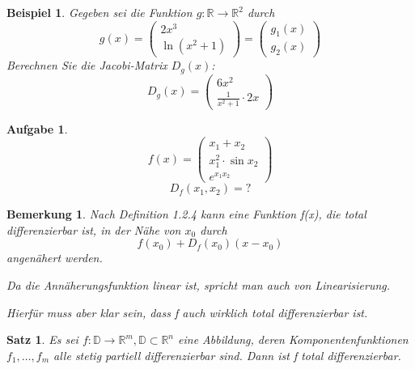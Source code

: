 \documentclass[12pt,a4paper]{scrreprt}
\newtheorem{bemerkung}[defi]{Bemerkung}
\newtheorem{beispiel}[defi]{Beispiel}
\newtheorem{satz}[defi]{Satz}
\newtheorem{aufg}[defi]{Aufgabe}
\begin{document}
\begin{beispiel}
	Gegeben sei die Funktion $g:\mathbb{R}\to\mathbb{R}^2$ durch \[g(x)=\begin{pmatrix}2x^3 \\ \ln(x^2+1)
	\end{pmatrix} = \begin{pmatrix}
	g_1(x) \\ g_2(x)
	\end{pmatrix}\]
	Berechnen Sie die Jacobi-Matrix $D_g(x)$:
	\[D_g(x)=\begin{pmatrix}6x^2 \\ \frac{1}{x^2+1}\cdot2x\end{pmatrix}\]
\end{beispiel}

\begin{aufg}
	\[f(x)=\begin{pmatrix}
	x_1 + x_2 \\
	x_1^2\cdot\sin x_2 \\
	e^{x_1x_2}
	\end{pmatrix}\]
	\[D_f(x_1,x_2)=?\]
\end{aufg}

\begin{bemerkung}
	Nach Definition 1.2.4 kann eine Funktion f(x), die total differenzierbar ist, in der Nähe von $x_0$ durch \[f(x_0)+D_f(x_0)(x-x_0)\] angenähert werden.
	
	Da die Annäherungsfunktion linear ist, spricht man auch von Linearisierung.
	
	Hierfür muss aber klar sein, dass f auch wirklich total differenzierbar ist.
\end{bemerkung}

\begin{satz}
	Es sei $f:\mathbb{D}\to \mathbb{R}^m,\mathbb{D}\subset\mathbb{R}^n$ eine Abbildung, deren Komponentenfunktionen $f_1,\dots,f_m$ alle stetig partiell differenzierbar sind. Dann ist f total differenzierbar.
\end{satz}
\end{document}
